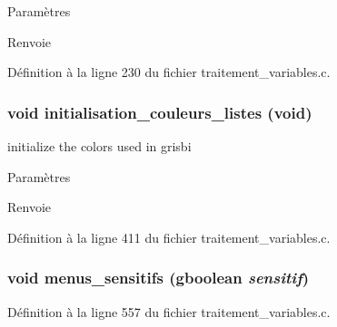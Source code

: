 \begin{DoxyParams}{Paramètres}
\item[{\em }]\end{DoxyParams}
\begin{DoxyReturn}{Renvoie}

\end{DoxyReturn}


Définition à la ligne 230 du fichier traitement\_\-variables.c.

\subsubsection[{initialisation\_\-couleurs\_\-listes}]{\setlength{\rightskip}{0pt plus 5cm}void initialisation\_\-couleurs\_\-listes (void)}\label{traitement__variables_8h_ad4677c922d0cacebadce1b8ce0d8ab5d}
initialize the colors used in grisbi


\begin{DoxyParams}{Paramètres}
\item[{\em }]\end{DoxyParams}
\begin{DoxyReturn}{Renvoie}

\end{DoxyReturn}


Définition à la ligne 411 du fichier traitement\_\-variables.c.

\subsubsection[{menus\_\-sensitifs}]{\setlength{\rightskip}{0pt plus 5cm}void menus\_\-sensitifs (gboolean {\em sensitif})}\label{traitement__variables_8h_a7221297bdb47010fd4b397a965100257}


Définition à la ligne 557 du fichier traitement\_\-variables.c.

